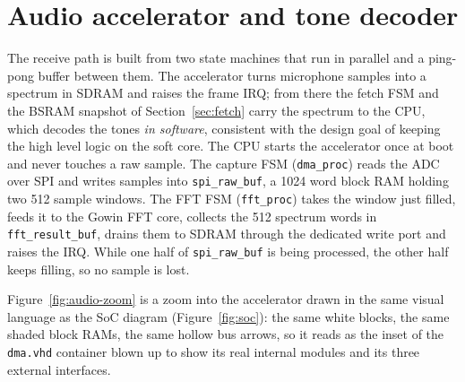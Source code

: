 \documentclass[a4paper,11pt]{article}
\begin{document}
\section{Audio accelerator and tone decoder}
\label{sec:accel}

The receive path is built from two state machines that run in parallel and a
ping-pong buffer between them. The accelerator turns microphone samples into a
spectrum in SDRAM and raises the frame IRQ; from there the fetch FSM and the
BSRAM snapshot of Section~\ref{sec:fetch} carry the spectrum to the CPU, which
decodes the tones \emph{in software}, consistent with the design goal of keeping
the high level logic on the soft core. The CPU starts the accelerator once at
boot and never touches a raw sample. The capture FSM (\texttt{dma\_proc}) reads the
ADC over SPI and writes samples into \texttt{spi\_raw\_buf}, a 1024 word block RAM
holding two 512 sample windows. The FFT FSM (\texttt{fft\_proc}) takes the window
just filled, feeds it to the Gowin FFT core, collects the 512 spectrum words in
\texttt{fft\_result\_buf}, drains them to SDRAM through the dedicated write port
and raises the IRQ. While one half of \texttt{spi\_raw\_buf} is being processed,
the other half keeps filling, so no sample is lost.

Figure~\ref{fig:audio-zoom} is a zoom into the accelerator drawn in the same
visual language as the SoC diagram (Figure~\ref{fig:soc}): the same white blocks,
the same shaded block RAMs, the same hollow bus arrows, so it reads as the inset
of the \texttt{dma.vhd} container blown up to show its real internal modules and
its three external interfaces.
\end{document}
